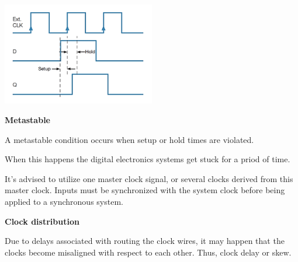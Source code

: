 \begin{center}
	\includegraphics[width=0.5\textwidth]{images/hold.png}
\end{center}

\textbf{Metastable}

A metastable condition occurs when setup or hold times are
violated.

When this happens the digital electronics systems get stuck
for a priod of time.

It's advised to utilize one master clock signal, or several clocks
derived from this master clock. Inputs must be synchronized with
the system clock before being applied to a synchronous system.


\textbf{Clock distribution}

Due to delays associated with routing the clock wires, it may
happen that the clocks become misaligned with respect to each other.
Thus, clock delay or skew.
